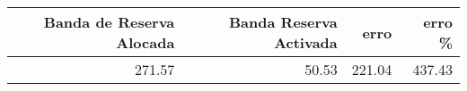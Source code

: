\begin{tabular}{rrrr}
\toprule
Banda de Reserva Alocada & Banda Reserva Activada & erro & erro \% \\
\midrule
271.57 & 50.53 & 221.04 & 437.43 \\
\bottomrule
\end{tabular}
